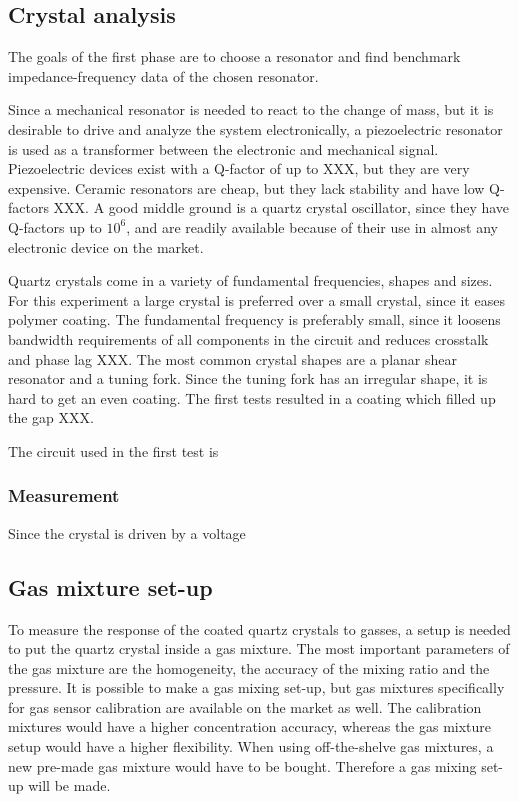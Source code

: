 \subsection{Crystal analysis}
The goals of the first phase are to choose a resonator and find benchmark impedance-frequency data of the chosen resonator. 

Since a mechanical resonator is needed to react to the change of mass, but it is desirable to drive and analyze the system electronically, a piezoelectric resonator is used as a transformer between the electronic and mechanical signal. Piezoelectric devices exist with a Q-factor of up to XXX, but they are very expensive. Ceramic resonators are cheap, but they lack stability and have low Q-factors XXX. A good middle ground is a quartz crystal oscillator, since they have Q-factors up to $10^6$, and are readily available because of their use in almost any electronic device on the market. 

Quartz crystals come in a variety of fundamental frequencies, shapes and sizes. For this experiment a large crystal is preferred over a small crystal, since it eases polymer coating. The fundamental frequency is preferably small, since it loosens bandwidth requirements of all components in the circuit and reduces crosstalk and phase lag XXX. The most common crystal shapes are a planar shear resonator and a tuning fork. Since the tuning fork has an irregular shape, it is hard to get an even coating. The first tests resulted in a coating which filled up the gap XXX. 

The circuit used in the first test is 

\subsubsection{Measurement}
Since the crystal is driven by a voltage 

\subsection{Gas mixture set-up}
To measure the response of the coated quartz crystals to gasses, a setup is needed to put the quartz crystal inside a gas mixture. The most important parameters of the gas mixture are the homogeneity, the accuracy of the mixing ratio and the pressure. It is possible to make a gas mixing set-up, but gas mixtures specifically for gas sensor calibration are available on the market as well. The calibration mixtures would have a higher concentration accuracy, whereas the gas mixture setup would have a higher flexibility. When using off-the-shelve gas mixtures, a new pre-made gas mixture would have to be bought. Therefore a gas mixing set-up will be made. 